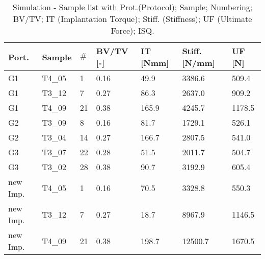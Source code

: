 \documentclass[12pt, a4paper, twoside]{report}
\begin{document}
%
\newpage
\begin{table}[H]
    \begin{tabular}{l|l|l|l|l|l|l}

        Port.    & Sample & $\#$  & BV/TV [-] & IT [Nmm] & Stiff. [N/mm] & UF [N] \\ \hline
        G1       & T4\_05  & 1  & 0.16      & 49.9     & 3386.6        & 509.4  \\ 
        G1       & T3\_12  & 7  & 0.27      & 86.3     & 2637.0        & 909.2  \\ 
        G1       & T4\_09  & 21 & 0.38      & 165.9    & 4245.7        & 1178.5 \\ 
        G2       & T3\_09  & 8  & 0.16      & 81.7     & 1729.1        & 526.1  \\ 
        G2       & T3\_04  & 14 & 0.27      & 166.7    & 2807.5        & 541.0  \\ 
        G3       & T3\_07  & 22 & 0.28      & 51.5     & 2011.7        & 504.7  \\ 
        G3       & T3\_02  & 28 & 0.38      & 90.7     & 3192.9        & 605.4  \\ 
        new Imp. & T4\_05  & 1  & 0.16      & 70.5     & 3328.8        & 550.3  \\ 
        new Imp. & T3\_12  & 7  & 0.27      & 18.7     & 8967.9        & 1146.5 \\ 
        new Imp. & T4\_09  & 21 & 0.38      & 198.7    & 12500.7       & 1670.5 \\

    \end{tabular}
		\caption{Simulation - Sample list with Prot.(Protocol); Sample; Numbering; BV/TV; IT (Implantation Torque); Stiff. (Stiffness); UF (Ultimate Force); ISQ.}
		\label{tab:TabSamples_sim}
\end{table}

\newpage
%
%
%

%

%
\backmatter



\end{document}
